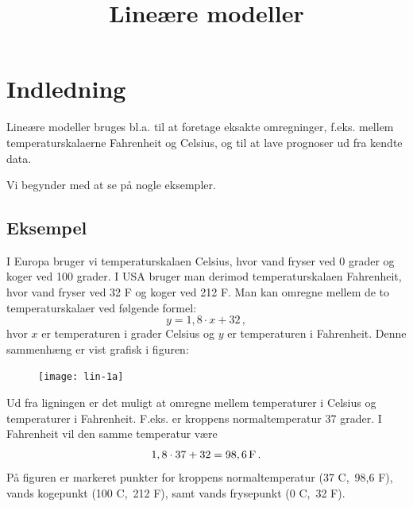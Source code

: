 \documentclass[12pt,oneside,a4paper]{article}
\title{Lineære modeller}
\date{\vspace{-5ex}}
\begin{document}
\maketitle


\section{Indledning}
Lineære modeller bruges bl.a. til at foretage eksakte omregninger, f.eks.
mellem temperaturskalaerne Fahrenheit og Celsius, og til at lave prognoser ud
fra kendte data.

Vi begynder med at se på nogle eksempler.

\begin{tcolorbox}
\subsection{Eksempel}
I Europa bruger vi temperaturskalaen Celsius, hvor vand fryser ved 0 grader og
koger ved 100 grader.  I USA bruger man derimod temperaturskalaen Fah\-renheit,
hvor vand fryser ved 32 F og koger ved 212 F.
Man kan omregne mellem de to temperaturskalaer ved følgende formel:
\[
    y = 1,8\cdot x  + 32 \,,
\]
hvor $x$ er temperaturen i grader Celsius og $y$ er temperaturen i Fahrenheit.
Denne sammenhæng er vist grafisk i figuren:

\begin{figure}[H]
    \centering
    \texttt{[image: lin-1a]}
    \caption{}
\end{figure}

Ud fra ligningen er det muligt at omregne mellem temperaturer i Celsius og
temperaturer i Fahrenheit. F.eks.  er kroppens normaltemperatur 37 grader. I
Fahrenheit vil den samme temperatur være
\[
    1,8\cdot 37 + 32 = 98,6\, {\rm F} \,.
\]
På figuren er markeret punkter for kroppens normaltemperatur (37 C,\, 98,6 F),
vands kogepunkt (100 C,\, 212 F), samt vands frysepunkt (0 C,\, 32 F).
\end{tcolorbox}
\end{document}
